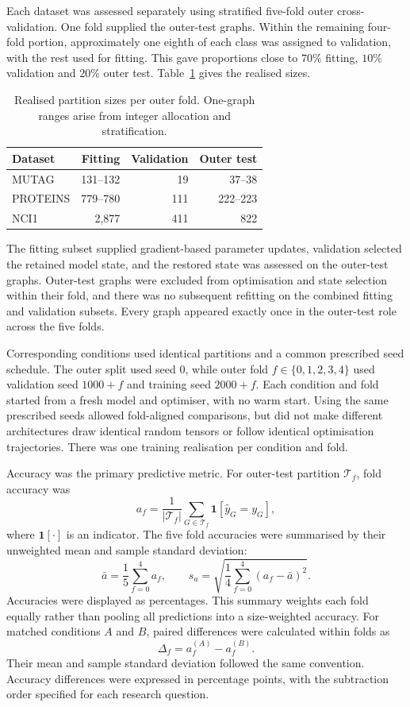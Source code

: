 \documentclass[11pt,a4paper]{article}
\begin{document}
Each dataset was assessed separately using stratified five-fold outer cross-validation. One fold supplied the outer-test graphs. Within the remaining four-fold portion, approximately one eighth of each class was assigned to validation, with the rest used for fitting. This gave proportions close to \(70\%\) fitting, \(10\%\) validation and \(20\%\) outer test. Table~\ref{tab:partitions} gives the realised sizes.

\begin{table}[!ht]
\centering
\caption{Realised partition sizes per outer fold. One-graph ranges arise from integer allocation and stratification.}
\label{tab:partitions}
\begin{tabular}{@{}lrrr@{}}
\toprule
Dataset & Fitting & Validation & Outer test\\
\midrule
MUTAG & 131--132 & 19 & 37--38\\
PROTEINS & 779--780 & 111 & 222--223\\
NCI1 & 2,877 & 411 & 822\\
\bottomrule
\end{tabular}
\end{table}

The fitting subset supplied gradient-based parameter updates, validation selected the retained model state, and the restored state was assessed on the outer-test graphs. Outer-test graphs were excluded from optimisation and state selection within their fold, and there was no subsequent refitting on the combined fitting and validation subsets. Every graph appeared exactly once in the outer-test role across the five folds.

Corresponding conditions used identical partitions and a common prescribed seed schedule. The outer split used seed 0, while outer fold \(f\in\{0,1,2,3,4\}\) used validation seed \(1000+f\) and training seed \(2000+f\). Each condition and fold started from a fresh model and optimiser, with no warm start. Using the same prescribed seeds allowed fold-aligned comparisons, but did not make different architectures draw identical random tensors or follow identical optimisation trajectories. There was one training realisation per condition and fold.

Accuracy was the primary predictive metric. For outer-test partition \(\mathcal{T}_f\), fold accuracy was
\[
a_f=\frac{1}{|\mathcal{T}_f|}
\sum_{G\in\mathcal{T}_f}\mathbf{1}[\widehat{y}_G=y_G],
\]
where \(\mathbf{1}[\cdot]\) is an indicator. The five fold accuracies were summarised by their unweighted mean and sample standard deviation:
\[
\bar{a}=\frac{1}{5}\sum_{f=0}^{4}a_f,
\qquad
s_a=\sqrt{\frac{1}{4}\sum_{f=0}^{4}(a_f-\bar{a})^2}.
\]
Accuracies were displayed as percentages. This summary weights each fold equally rather than pooling all predictions into a size-weighted accuracy. For matched conditions \(A\) and \(B\), paired differences were calculated within folds as
\[
\Delta_f=a_f^{(A)}-a_f^{(B)}.
\]
Their mean and sample standard deviation followed the same convention. Accuracy differences were expressed in percentage points, with the subtraction order specified for each research question.
\end{document}
